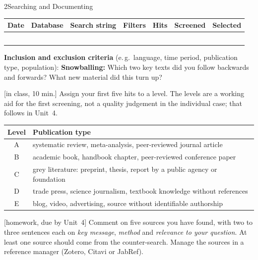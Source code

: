 \begin{uebungsblattb}{2}{Searching and Documenting}
\begin{center}
\small
\renewcommand{\arraystretch}{2.4}
\begin{tabular}{|p{}|p{}|p{}|p{}|p{}|p{}|p{}|}
\hline
\textbf{Date} & \textbf{Database} & \textbf{Search string} & \textbf{Filters} &
\textbf{Hits} & \textbf{Screen\-ed} & \textbf{Se\-lect\-ed} \\ \hline
 & & & & & & \\ \hline
 & & & & & & \\ \hline
 & & & & & & \\ \hline
 & & & & & & \\ \hline
 & & & & & & \\ \hline
\end{tabular}
\end{center}
\noindent\textbf{Inclusion and exclusion criteria} (e.\,g.\ language, time
period, publication type, population):
\noindent\textbf{Snowballing:} Which two key texts did you follow backwards
and forwards? What new material did this turn up?

[in class, 10 min.]
Assign your first five hits to a level. The levels are a working aid for
the first screening, not a quality judgement in the individual case; that
follows in Unit~4.

\begin{center}
\small
\begin{tabular}{cp{}}
\toprule
\textbf{Level} & \textbf{Publication type} \\
\midrule
A & systematic review, meta-analysis, peer-reviewed journal article \\
B & academic book, handbook chapter, peer-reviewed conference paper \\
C & grey literature: preprint, thesis, report by a public agency or foundation \\
D & trade press, science journalism, textbook knowledge without references \\
E & blog, video, advertising, source without identifiable authorship \\
\bottomrule
\end{tabular}
\end{center}

[homework, due by Unit~4]
Comment on five sources you have found, with two to three sentences each
on \emph{key message}, \emph{method} and \emph{relevance to your
question}. At least one source should come from the counter-search. Manage
the sources in a reference manager (Zotero, Citavi or JabRef).


\end{uebungsblattb}
